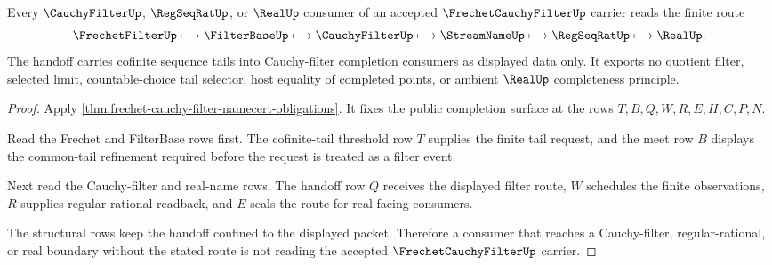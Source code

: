 \begin{theorem}
\label{thm:frechet-cauchy-filter-completion-handoff}
Every $\CauchyFilterUp$, $\RegSeqRatUp$, or $\RealUp$ consumer of an accepted $\FrechetCauchyFilterUp$ carrier reads the finite route
$$
\FrechetFilterUp \longmapsto \FilterBaseUp \longmapsto \CauchyFilterUp \longmapsto \StreamNameUp \longmapsto \RegSeqRatUp \longmapsto \RealUp .
$$
The handoff carries cofinite sequence tails into Cauchy-filter completion consumers as displayed data only. It exports no quotient filter, selected limit, countable-choice tail selector, host equality of completed points, or ambient $\RealUp$ completeness principle.
\end{theorem}
\begin{proof}
Apply \autoref{thm:frechet-cauchy-filter-namecert-obligations}. It fixes the public completion surface at the rows $T,B,Q,W,R,E,H,C,P,N$.

Read the Frechet and FilterBase rows first. The cofinite-tail threshold row $T$ supplies the finite tail request, and the meet row $B$ displays the common-tail refinement required before the request is treated as a filter event.

Next read the Cauchy-filter and real-name rows. The handoff row $Q$ receives the displayed filter route, $W$ schedules the finite observations, $R$ supplies regular rational readback, and $E$ seals the route for real-facing consumers.

The structural rows keep the handoff confined to the displayed packet. Therefore a consumer that reaches a Cauchy-filter, regular-rational, or real boundary without the stated route is not reading the accepted $\FrechetCauchyFilterUp$ carrier.
\end{proof}

